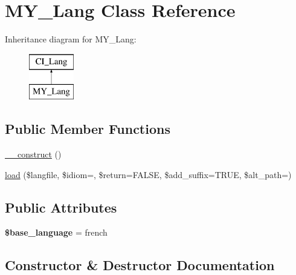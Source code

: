 \hypertarget{class_m_y___lang}{}\section{M\+Y\+\_\+\+Lang Class Reference}
\label{class_m_y___lang}
Inheritance diagram for M\+Y\+\_\+\+Lang\+:\begin{figure}[H]
\begin{center}
\leavevmode
\includegraphics[height=2.000000cm]{class_m_y___lang}
\end{center}
\end{figure}
\subsection*{Public Member Functions}
\begin{DoxyCompactItemize}
\item 
\mbox{\hyperlink{class_m_y___lang_a9dbd399a2a3955e99bc85b00999def5a}{\+\_\+\+\_\+construct}} ()
\item 
\mbox{\hyperlink{class_m_y___lang_ae337404afb5bd9f533340747b9432f76}{load}} (\$langfile, \$idiom=\textquotesingle{}\textquotesingle{}, \$return=F\+A\+L\+SE, \$add\+\_\+suffix=T\+R\+UE, \$alt\+\_\+path=\textquotesingle{}\textquotesingle{})
\end{DoxyCompactItemize}
\subsection*{Public Attributes}
\begin{DoxyCompactItemize}
\item 
\mbox{\label{class_m_y___lang_af2d5ff68f275c6f270ac097fe87ad348}} 
{\bfseries \$base\+\_\+language} = \textquotesingle{}french\textquotesingle{}
\end{DoxyCompactItemize}


\subsection{Constructor \& Destructor Documentation}
\mbox{\label{class_m_y___lang_a9dbd399a2a3955e99bc85b00999def5a}} 
